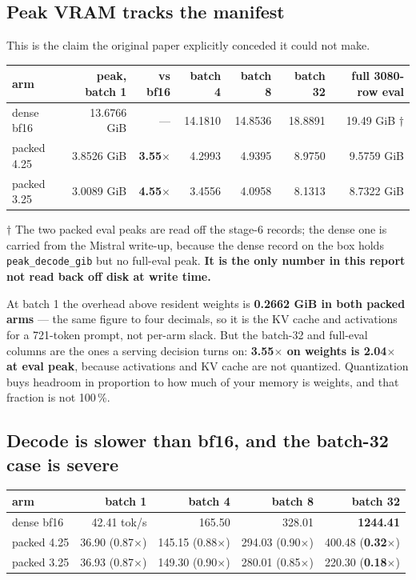 \documentclass[11pt]{article}
\newcommand{\x}{\texorpdfstring{$\times$}{x}}
\newcommand{\pct}{\,\%}
\newcommand{\code}[1]{\texttt{#1}}
\newcommand{\best}[1]{\textbf{#1}}
\begin{document}
\subsection{Peak VRAM tracks the manifest}

This is the claim the original paper explicitly conceded it could not make.

\begin{center}\small
\begin{tabular}{@{}lrrrrrr@{}}
\toprule
arm & peak, batch 1 & vs bf16 & batch 4 & batch 8 & batch 32 & full 3080-row eval \\
\midrule
dense bf16 & 13.6766 GiB & --- & 14.1810 & 14.8536 & 18.8891 & 19.49 GiB $\dagger$ \\
packed 4.25 & 3.8526 GiB & \best{3.55\x} & 4.2993 & 4.9395 & 8.9750 & 9.5759 GiB \\
packed 3.25 & 3.0089 GiB & \best{4.55\x} & 3.4556 & 4.0958 & 8.1313 & 8.7322 GiB \\
\bottomrule
\end{tabular}
\end{center}

$\dagger$ The two packed eval peaks are read off the stage-6 records; the dense one is carried
from the Mistral write-up, because the dense record on the box holds \code{peak\_decode\_gib} but
no full-eval peak. \textbf{It is the only number in this report not read back off disk at write
time.}

At batch 1 the overhead above resident weights is \textbf{0.2662 GiB in both packed arms} --- the
same figure to four decimals, so it is the KV cache and activations for a 721-token prompt, not
per-arm slack. But the batch-32 and full-eval columns are the ones a serving decision turns on:
\textbf{3.55\x{} on weights is 2.04\x{} at eval peak}, because activations and KV cache are not
quantized. Quantization buys headroom in proportion to how much of your memory is weights, and
that fraction is not 100\pct.

\subsection{Decode is slower than bf16, and the batch-32 case is severe}

\begin{center}\small
\begin{tabular}{@{}lrrrr@{}}
\toprule
arm & batch 1 & batch 4 & batch 8 & batch 32 \\
\midrule
dense bf16 & 42.41 tok/s & 165.50 & 328.01 & \best{1244.41} \\
packed 4.25 & 36.90 (0.87\x) & 145.15 (0.88\x) & 294.03 (0.90\x) & 400.48 (\best{0.32\x}) \\
packed 3.25 & 36.93 (0.87\x) & 149.30 (0.90\x) & 280.01 (0.85\x) & 220.30 (\best{0.18\x}) \\
\bottomrule
\end{tabular}
\end{center}
\end{document}

